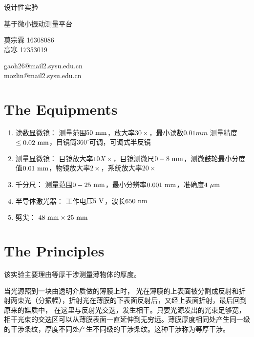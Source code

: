 \documentclass[CJK]{beamer}
\author{}
\date{}
\begin{document}
\begin{frame}
 
\begin{center}
\bch
\begin{Large}
设计性实验

\skipline
基于微小振动测量平台



\end{Large}
\skipline
莫宗霖   16308086 \\
高寒     17353019


gaoh26@mail2.sysu.edu.cn \\
mozlin@mail2.sysu.edu.cn
\ech
\end{center}
\end{frame}


\section{The Equipments}

\begin{frame}
\bch
\begin{enumerate}
\item 读数显微镜：     测量范围$50{\rm \ mm}$，放大率$30\times$，最小读数$0.01mm$
                        测量精度$\leq0.02{\rm \ mm}$，目镜筒$360^\circ$可调，可调式半反镜
\item 测量显微镜：     目镜放大率$10X\times$，目镜测微尺$0-8{\rm \ mm}$，测微鼓轮最小分度
                        值$0.01{\rm \ mm}$，物镜放大率$2\times$，系统放大率$20\times$
\item 千分尺：        测量范围$0-25{\rm \ mm}$，最小分辨率$0.001{\rm \ mm}$，准确度$4{\rm \ \mu m}$
\item 半导体激光器：  工作电压$5{\rm \ V}$，波长$650{\rm \ nm}$
\item 劈尖：         $48{\rm \ mm}\times25{\rm \ mm}$
\end{enumerate}
\ech
\end{frame}

\section{The Principles}
\begin{frame}
\bch
该实验主要理由等厚干涉测量薄物体的厚度。\par
当光源照到一块由透明介质做的薄膜上时， 光在薄膜的上表面被分割成反射和折射两束光（分振幅），折射光在薄膜的下表面反射后，又经上表面折射，最后回到原来的媒质中， 在这里与反射光交迭，发生相干。只要光源发出的光束足够宽，相干光束的交迭区可以从薄膜表面一直延伸到无穷远。薄膜厚度相同处产生同一级的干涉条纹，厚度不同处产生不同级的干涉条纹。这种干涉称为等厚干涉。
\ech
\end{frame}
\end{document}
